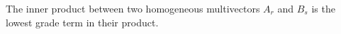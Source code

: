 \begin{definition}\label{d:inner-product1}
	The inner product between two homogeneous multivectors $A_r$ and $B_s$ is the lowest grade term in their product.
\end{definition}
